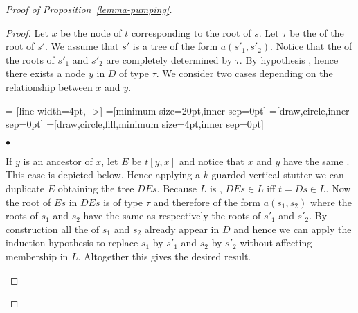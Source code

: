 \begin{proof}[Proof of Proposition~\ref{lemma-pumping}]
\begin{proof}
  Let $x$ be the node of $t$ corresponding to the root of $s$. Let $\tau$ be
  the  of the root of $s'$. We assume that $s'$ is a tree of the
  form $a(s'_1,s'_2)$. Notice that the \ktype of the roots of $s'_1$ and $s'_2$
  are completely determined by $\tau$. By hypothesis ,
  hence there exists a node $y$ in $D$ of type $\tau$. We consider two
  cases depending on the relationship between $x$ and $y$.

 = [line width=4pt, ->]
=[minimum size=20pt,inner sep=0pt]
=[draw,circle,inner sep=0pt]
=[draw,circle,fill,minimum size=4pt,inner sep=0pt]

\begin{iteMize}{$\bullet$}
\item If $y$ is an ancestor of $x$, let $E$ be $t[y,x]$ and notice that $x$ and
  $y$ have the same \ktype. This case is depicted below. Hence applying a $k$-guarded vertical stutter we
  can duplicate $E$ obtaining the tree $DEs$. Because $L$ is \ktame, $DEs \in
  L$ iff $t=Ds \in L$. Now the root of $Es$ in $DEs$ is of type $\tau$ and therefore of
  the form $a(s_1,s_2)$ where the roots of $s_1$ and $s_2$ have the same \ktype
  as respectively the roots of $s'_1$ and $s'_2$. By construction all the
   of $s_1$ and $s_2$ already appear in $D$ and hence we can apply
  the induction hypothesis to replace $s_1$ by $s'_1$ and $s_2$ by $s'_2$
  without affecting membership in $L$. Altogether this gives the desired
  result.
\begin{center}
\end{center}
\end{iteMize}
\end{proof}
\end{proof}
